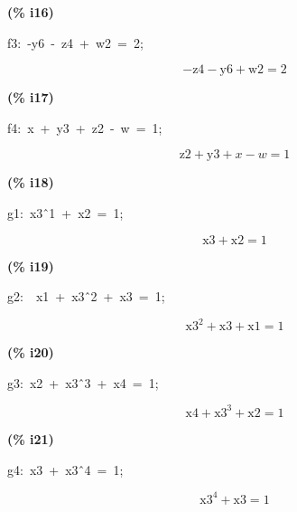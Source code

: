 \documentclass[fleqn]{article}
\begin{document}
\noindent
\begin{minipage}[t]{4.000000em}\color{red}\bfseries
(\% i16)	
\end{minipage}
\begin{minipage}[t]{\textwidth}\color{blue}
f3:\ -y6\ -\ z4\ +\ w2\ =\ 2;\ 
\end{minipage}
\[\displaystyle \tag{f3} 
\mathop{-}\ensuremath{\mathrm{z4}}\mathop{-}\ensuremath{\mathrm{y6}}\mathop{+}\ensuremath{\mathrm{w2}}\mathop{=}2\mbox{}
\]


\noindent
\begin{minipage}[t]{4.000000em}\color{red}\bfseries
(\% i17)	
\end{minipage}
\begin{minipage}[t]{\textwidth}\color{blue}
f4:\ x\ +\ y3\ +\ z2\ -\ w\ =\ 1;
\end{minipage}
\[\displaystyle \tag{f4} 
\ensuremath{\mathrm{z2}}\mathop{+}\ensuremath{\mathrm{y3}}\mathop{+}x\mathop{-}w\mathop{=}1\mbox{}
\]


\noindent
\begin{minipage}[t]{4.000000em}\color{red}\bfseries
(\% i18)	
\end{minipage}
\begin{minipage}[t]{\textwidth}\color{blue}
g1:\ x3\^\ 1\ +\ x2\ =\ 1;
\end{minipage}
\[\displaystyle \tag{g1} 
\ensuremath{\mathrm{x3}}\mathop{+}\ensuremath{\mathrm{x2}}\mathop{=}1\mbox{}
\]


\noindent
\begin{minipage}[t]{4.000000em}\color{red}\bfseries
(\% i19)	
\end{minipage}
\begin{minipage}[t]{\textwidth}\color{blue}
g2:\ \ x1\ +\ x3\^\ 2\ +\ x3\ =\ 1;
\end{minipage}
\[\displaystyle \tag{g2} 
{{\ensuremath{\mathrm{x3}}}^{2}}\mathop{+}\ensuremath{\mathrm{x3}}\mathop{+}\ensuremath{\mathrm{x1}}\mathop{=}1\mbox{}
\]


\noindent
\begin{minipage}[t]{4.000000em}\color{red}\bfseries
(\% i20)	
\end{minipage}
\begin{minipage}[t]{\textwidth}\color{blue}
g3:\ x2\ +\ x3\^\ 3\ +\ x4\ =\ 1;
\end{minipage}
\[\displaystyle \tag{g3} 
\ensuremath{\mathrm{x4}}\mathop{+}{{\ensuremath{\mathrm{x3}}}^{3}}\mathop{+}\ensuremath{\mathrm{x2}}\mathop{=}1\mbox{}
\]


\noindent
\begin{minipage}[t]{4.000000em}\color{red}\bfseries
(\% i21)	
\end{minipage}
\begin{minipage}[t]{\textwidth}\color{blue}
g4:\ x3\ +\ x3\^\ 4\ =\ 1;
\end{minipage}
\[\displaystyle \tag{g4} 
{{\ensuremath{\mathrm{x3}}}^{4}}\mathop{+}\ensuremath{\mathrm{x3}}\mathop{=}1\mbox{}
\]
\end{document}

